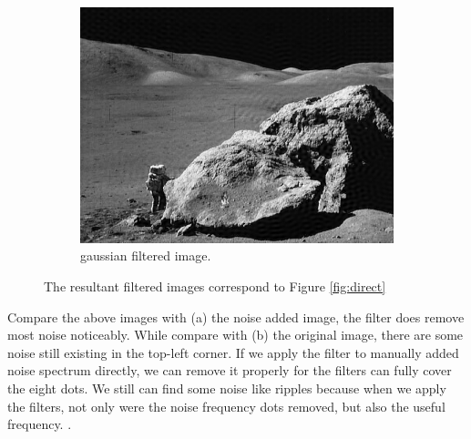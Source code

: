 \documentclass[14pt]{article}
\begin{document}
\begin{figure}[hbt!]
\begin{subfigure}[b]{0.3\linewidth}
			\includegraphics[width=\linewidth]{gaussian_image_man.png}
			\caption{gaussian filtered image.}
		\end{subfigure}
		\caption{The resultant filtered images correspond to Figure \ref{fig:direct}}
	\end{figure}
		Compare the above images with (a) the noise added image, the filter does remove most noise noticeably. While compare with (b) the original image, there are some noise still existing in the top-left corner. If we apply the filter to manually added noise spectrum directly, we can remove it properly for the filters can fully cover the eight dots. We still can find some noise like ripples because when we apply the filters, not only were the noise frequency dots removed, but also the useful frequency.
		.~
\end{document}

